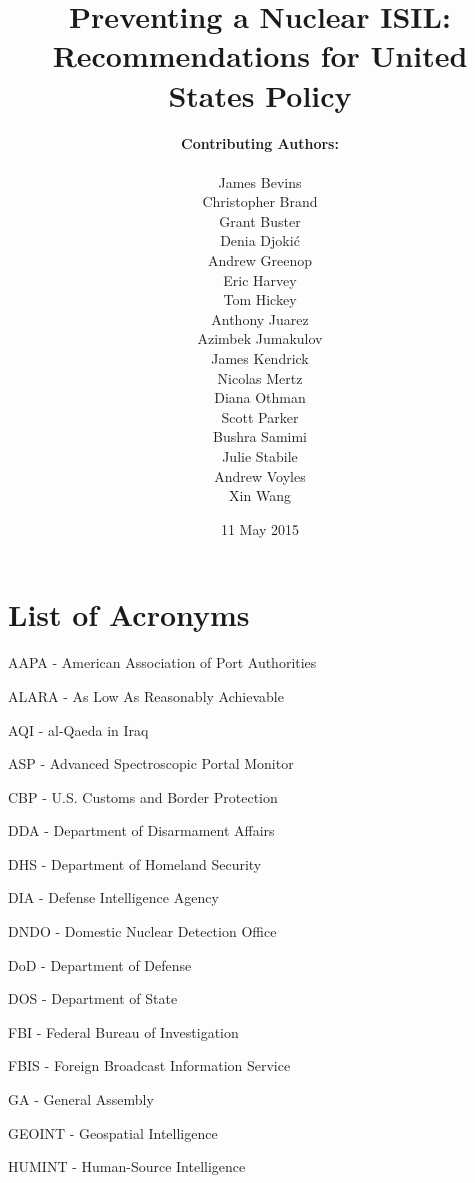 \documentclass{report}
\title{Preventing a Nuclear ISIL: \\Recommendations for United States Policy}
\date{11 May 2015}
\author{\textbf{Contributing Authors:}\\ \\
James	Bevins\\
Christopher	Brand \\
Grant	Buster\\
Denia	Djoki\'{c}\\
Andrew	Greenop\\
Eric	Harvey\\
Tom	Hickey\\
Anthony	Juarez\\
Azimbek	Jumakulov \\
James	Kendrick\\
Nicolas	Mertz \\
Diana	Othman \\
Scott	Parker \\
Bushra	Samimi \\
Julie	Stabile\\
Andrew	Voyles\\
Xin	Wang
}
\begin{document}
% 
% 
% 
% 
% 


\begin{titlepage}
\maketitle
\thispagestyle{empty}
\end{titlepage}

\pagestyle{fancyTOC}


\tableofcontents
\pagestyle{fancyTOC}




\listoffigures
\thispagestyle{fancyTOC}


\listoftables
\thispagestyle{fancyTOC}

\newpage


\pagestyle{fancyacronym}

\chapter*{List of Acronyms}
\pagestyle{fancyacronym}


AAPA - American Association of Port Authorities

ALARA - As Low As Reasonably Achievable

AQI -  al-Qaeda in Iraq

ASP - Advanced Spectroscopic Portal Monitor

CBP - U.S. Customs and Border Protection

DDA - Department of Disarmament Affairs

DHS - Department of Homeland Security

DIA - Defense Intelligence Agency

DNDO - Domestic Nuclear Detection Office

DoD - Department of Defense

DOS - Department of State

FBI - Federal Bureau of Investigation

FBIS - Foreign Broadcast Information Service

GA - General Assembly

GEOINT - Geospatial Intelligence

HUMINT - Human-Source Intelligence
\end{document}
